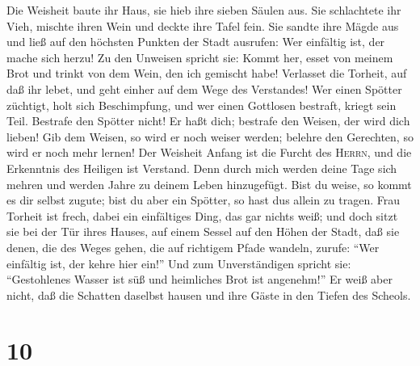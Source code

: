  Die Weisheit baute ihr Haus, sie hieb ihre sieben Säulen
aus.  Sie schlachtete ihr Vieh, mischte ihren Wein und
deckte ihre Tafel fein.  Sie sandte ihre Mägde aus und
ließ auf den höchsten Punkten der Stadt ausrufen:  Wer
einfältig ist, der mache sich herzu!  Zu den Unweisen
spricht sie: Kommt her, esset von meinem Brot und trinkt von dem Wein,
den ich gemischt habe!  Verlasset die Torheit, auf daß ihr
lebet, und geht einher auf dem Wege des Verstandes!  Wer
einen Spötter züchtigt, holt sich Beschimpfung, und wer einen Gottlosen
bestraft, kriegt sein Teil.  Bestrafe den Spötter nicht!
Er haßt dich; bestrafe den Weisen, der wird dich lieben! 
Gib dem Weisen, so wird er noch weiser werden; belehre den Gerechten, so
wird er noch mehr lernen!  Der Weisheit Anfang ist die
Furcht des \textsc{Herrn}, und die Erkenntnis des Heiligen ist Verstand.
 Denn durch mich werden deine Tage sich mehren und werden
Jahre zu deinem Leben hinzugefügt.  Bist du weise, so
kommt es dir selbst zugute; bist du aber ein Spötter, so hast
du\textquotesingle s allein zu tragen.  Frau Torheit ist
frech, dabei ein einfältiges Ding, das gar nichts weiß; 
und doch sitzt sie bei der Tür ihres Hauses, auf einem Sessel auf den
Höhen der Stadt,  daß sie denen, die des Weges gehen, die
auf richtigem Pfade wandeln, zurufe:  ``Wer einfältig
ist, der kehre hier ein!'' Und zum Unverständigen spricht sie:
 ``Gestohlenes Wasser ist süß und heimliches Brot ist
angenehm!''  Er weiß aber nicht, daß die Schatten
daselbst hausen und ihre Gäste in den Tiefen des Scheols.

\hypertarget{section-9}{%
\section{10}\label{section-9}}

